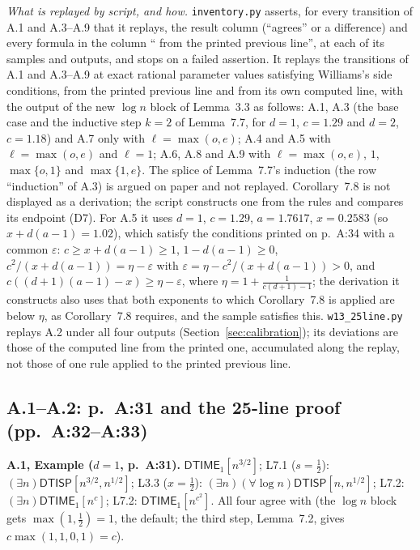 \documentclass[11pt]{article}
\theoremstyle{definition}
\newcommand{\DTIME}{\mathsf{DTIME}}
\newcommand{\DTISP}{\mathsf{DTISP}}
\newcommand{\leanus}{\textunderscore\allowbreak}
\newcommand{\lean}[1]{\ifmmode\text{\ttfamily #1}\else{\ttfamily\let\_\leanus #1}\fi}
\begin{document}
\emph{What is replayed by script, and how.} \texttt{inventory.py} asserts, for every transition of A.1 and A.3--A.9 that it replays, the result column (``agrees'' or a difference) and every formula in the column ``\lean{HY.Step} from the printed previous line'', at each of its samples and outputs, and stops on a failed assertion. It replays the transitions of A.1 and A.3--A.9 at exact rational parameter values satisfying Williams's side conditions, from the printed previous line and from its own computed line, with the output of the new $\log n$ block of Lemma~3.3 as follows: A.1, A.3 (the base case and the inductive step $k=2$ of Lemma~7.7, for $d=1$, $c=1.29$ and $d=2$, $c=1.18$) and A.7 only with $\ell=\max(o,e)$; A.4 and A.5 with $\ell=\max(o,e)$ and $\ell=1$; A.6, A.8 and A.9 with $\ell=\max(o,e)$, $1$, $\max\{o,1\}$ and $\max\{1,e\}$. The splice of Lemma~7.7's induction (the row ``induction'' of A.3) is argued on paper and not replayed. Corollary~7.8 is not displayed as a derivation; the script constructs one from the rules and compares its endpoint (D7). For A.5 it uses $d=1$, $c=1.29$, $a=1.7617$, $x=0.2583$ (so $x+d(a-1)=1.02$), which satisfy the conditions printed on p.~A:34 with a common $\varepsilon$: $c\ge x+d(a-1)\ge1$, $1-d(a-1)\ge0$, $c^2/(x+d(a-1))=\eta-\varepsilon$ with $\varepsilon=\eta-c^2/(x+d(a-1))>0$, and $c((d+1)(a-1)-x)\ge\eta-\varepsilon$, where $\eta=1+\frac1{c(d+1)-1}$; the derivation it constructs also uses that both exponents to which Corollary~7.8 is applied are below $\eta$, as Corollary~7.8 requires, and the sample satisfies this. \texttt{w13\_25line.py} replays A.2 under all four outputs (Section~\ref{sec:calibration}); its deviations are those of the computed line from the printed one, accumulated along the replay, not those of one rule applied to the printed previous line.

\subsection*{A.1--A.2: p.~A:31 and the 25-line proof (pp.~A:32--A:33)}
\textbf{A.1, Example ($d=1$, p.~A:31).} $\DTIME_1[n^{3/2}]$; L7.1 ($s=\frac12$): $(\exists n)\allowbreak\DTISP[n^{3/2},n^{1/2}]$; L3.3 ($x=\frac12$): $(\exists n)\allowbreak(\forall\log n)\allowbreak\DTISP[n,n^{1/2}]$; L7.2: $(\exists n)\allowbreak\DTIME_1[n^c]$; L7.2: $\DTIME_1[n^{c^2}]$. All four agree with \lean{HY.Step} (the $\log n$ block gets $\max(1,\frac12)=1$, the default; the third step, Lemma~7.2, gives $c\max(1,1,0,1)=c$).
\end{document}
